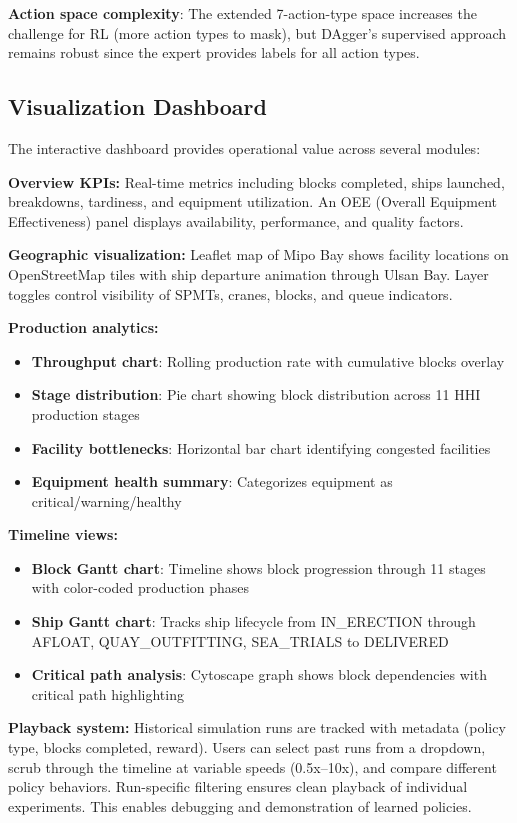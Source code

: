 \documentclass[11pt,a4paper]{article}
\begin{document}
\textbf{Action space complexity}: The extended 7-action-type space increases the challenge for RL (more action types to mask), but DAgger's supervised approach remains robust since the expert provides labels for all action types.

\subsection{Visualization Dashboard}

The interactive dashboard provides operational value across several modules:

\textbf{Overview KPIs:} Real-time metrics including blocks completed, ships launched, breakdowns, tardiness, and equipment utilization. An OEE (Overall Equipment Effectiveness) panel displays availability, performance, and quality factors.

\textbf{Geographic visualization:} Leaflet map of Mipo Bay shows facility locations on OpenStreetMap tiles with ship departure animation through Ulsan Bay. Layer toggles control visibility of SPMTs, cranes, blocks, and queue indicators.

\textbf{Production analytics:}
\begin{itemize}
    \item \textbf{Throughput chart}: Rolling production rate with cumulative blocks overlay
    \item \textbf{Stage distribution}: Pie chart showing block distribution across 11 HHI production stages
    \item \textbf{Facility bottlenecks}: Horizontal bar chart identifying congested facilities
    \item \textbf{Equipment health summary}: Categorizes equipment as critical/warning/healthy
\end{itemize}

\textbf{Timeline views:}
\begin{itemize}
    \item \textbf{Block Gantt chart}: Timeline shows block progression through 11 stages with color-coded production phases
    \item \textbf{Ship Gantt chart}: Tracks ship lifecycle from IN\_ERECTION through AFLOAT, QUAY\_OUTFITTING, SEA\_TRIALS to DELIVERED
    \item \textbf{Critical path analysis}: Cytoscape graph shows block dependencies with critical path highlighting
\end{itemize}

\textbf{Playback system:} Historical simulation runs are tracked with metadata (policy type, blocks completed, reward). Users can select past runs from a dropdown, scrub through the timeline at variable speeds (0.5x--10x), and compare different policy behaviors. Run-specific filtering ensures clean playback of individual experiments. This enables debugging and demonstration of learned policies.
\end{document}
